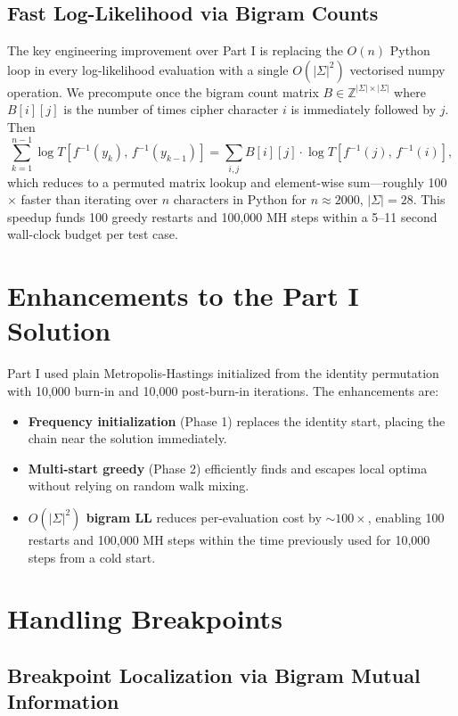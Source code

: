 \documentclass[12pt]{article}
\begin{document}
\subsection{Fast Log-Likelihood via Bigram Counts}

The key engineering improvement over Part I is replacing the $O(n)$ Python
loop in every log-likelihood evaluation with a single $O(|\Sigma|^2)$
vectorised numpy operation.  We precompute once the bigram count matrix
$B \in \mathbb{Z}^{|\Sigma|\times|\Sigma|}$ where $B[i][j]$ is the number of
times cipher character $i$ is immediately followed by $j$.  Then
\[
  \sum_{k=1}^{n-1} \log T\!\left[f^{-1}(y_k),\, f^{-1}(y_{k-1})\right]
  = \sum_{i,j} B[i][j]\cdot \log T\!\left[f^{-1}(j),\, f^{-1}(i)\right],
\]
which reduces to a permuted matrix lookup and element-wise sum---roughly
100$\times$ faster than iterating over $n$ characters in Python for
$n\approx 2000$, $|\Sigma|=28$.  This speedup funds 100 greedy restarts and
100,000 MH steps within a 5--11 second wall-clock budget per test case.

\section{Enhancements to the Part I Solution}

Part I used plain Metropolis-Hastings initialized from the identity
permutation with 10,000 burn-in and 10,000 post-burn-in iterations.  The
enhancements are:
\begin{itemize}
  \item \textbf{Frequency initialization} (Phase 1) replaces the identity
    start, placing the chain near the solution immediately.
  \item \textbf{Multi-start greedy} (Phase 2) efficiently finds and escapes
    local optima without relying on random walk mixing.
  \item \textbf{$O(|\Sigma|^2)$ bigram LL} reduces per-evaluation cost by
    $\sim$$100\times$, enabling 100 restarts and 100,000 MH steps within the
    time previously used for 10,000 steps from a cold start.
\end{itemize}

\section{Handling Breakpoints}

\subsection{Breakpoint Localization via Bigram Mutual Information}
\end{document}
